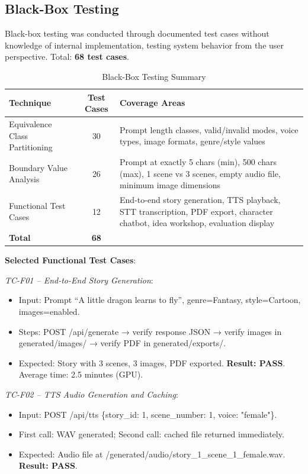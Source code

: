 \subsection{Black-Box Testing}

Black-box testing was conducted through documented test cases without knowledge of internal implementation, testing system behavior from the user perspective. Total: \textbf{68 test cases}.

\begin{table}[H]
\centering
\caption{Black-Box Testing Summary}
\begin{tabular}{|l|c|p{7cm}|}
\hline
\textbf{Technique} & \textbf{Test Cases} & \textbf{Coverage Areas} \\ \hline
Equivalence Class Partitioning & 30 & Prompt length classes, valid/invalid modes, voice types, image formats, genre/style values \\ \hline
Boundary Value Analysis & 26 & Prompt at exactly 5 chars (min), 500 chars (max), 1 scene vs 3 scenes, empty audio file, minimum image dimensions \\ \hline
Functional Test Cases & 12 & End-to-end story generation, TTS playback, STT transcription, PDF export, character chatbot, idea workshop, evaluation display \\ \hline
\textbf{Total} & \textbf{68} & \\ \hline
\end{tabular}
\label{tab:blackbox}
\end{table}

\textbf{Selected Functional Test Cases}:

\textit{TC-F01 -- End-to-End Story Generation}:
\begin{itemize}
    \item Input: Prompt ``A little dragon learns to fly'', genre=Fantasy, style=Cartoon, images=enabled.
    \item Steps: POST /api/generate → verify response JSON → verify images in generated/images/ → verify PDF in generated/exports/.
    \item Expected: Story with 3 scenes, 3 images, PDF exported. \textbf{Result: PASS}. Average time: 2.5 minutes (GPU).
\end{itemize}

\textit{TC-F02 -- TTS Audio Generation and Caching}:
\begin{itemize}
    \item Input: POST /api/tts \{story\_id: 1, scene\_number: 1, voice: "female"\}.
    \item First call: WAV generated; Second call: cached file returned immediately.
    \item Expected: Audio file at /generated/audio/story\_1\_scene\_1\_female.wav. \textbf{Result: PASS}.
\end{itemize}

